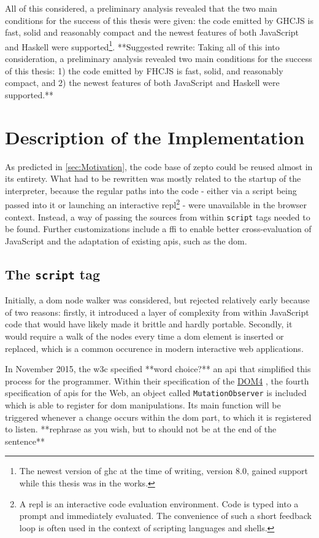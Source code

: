 \documentclass[oneside,11pt,xetex]{scrbook}
\begin{document}
All of this considered, a preliminary analysis revealed that the two main conditions for the success
of this thesis were given: the code emitted by GHCJS is fast, solid and reasonably compact and the
newest features of both JavaScript and Haskell were supported\footnote{The newest version of \gls{ghc}
at the time of writing, version 8.0, gained support while this thesis was in the works.}. **Suggested rewrite: Taking all of this into consideration, a preliminary analysis revealed two main conditions for the success of this thesis: 1) the code emitted by FHCJS is fast, solid, and reasonably compact, and 2) the newest features of both JavaScript and Haskell were supported.**

\section{Description of the Implementation}

As predicted in \ref{sec:Motivation}, the code base of zepto could be reused almost in its entirety.
What had to be rewritten was mostly related to the startup of the interpreter, because the regular
paths into the code - either via a script being passed into it or launching an interactive
\gls{repl}\footnote{A \gls{repl} is an interactive code evaluation environment. Code is typed into
a prompt and immediately evaluated. The convenience of such a short feedback loop is often used
in the context of scripting languages and shells.} - were unavailable in the browser context.
Instead, a way of passing the sources from within \texttt{script} tags needed to be found. Further
customizations include a \gls{ffi} to enable better cross-evaluation of JavaScript and the adaptation
of existing \gls{api}s, such as the \gls{dom}.

\subsection{The \texttt{script} tag}
\label{sec:MutObs}

Initially, a \gls{dom} node walker was considered, but rejected relatively early because of two reasons:
firstly, it introduced a layer of complexity from within JavaScript code that would have likely made
it brittle and hardly portable. Secondly, it would require a walk of the nodes every time a \gls{dom}
element is inserted or replaced, which is a common occurence in modern interactive web applications.

In November 2015, the \gls{w3c} specified **word choice?** an \gls{api} that simplified this process for the programmer.
Within their specification of the \href{https://www.w3.org/TR/dom/#mutationobserver}{DOM4} \parencite{DOM4}, the
fourth specification of \gls{api}s for the Web, an object called \texttt{MutationObserver} is included which
is able to register for \gls{dom} manipulations. Its main function will be triggered whenever a change
occurs within the \gls{dom} part, to which it is registered to listen. **rephrase as you wish, but to should not be at the end of the sentence**
\end{document}
